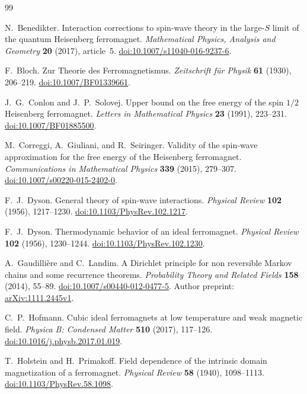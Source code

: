 \begin{thebibliography}{99}

N.~Benedikter.
Interaction corrections to spin-wave theory in the large-\(S\) limit of the
quantum Heisenberg ferromagnet.
\emph{Mathematical Physics, Analysis and Geometry} \textbf{20} (2017), article~5.
\href{https://doi.org/10.1007/s11040-016-9237-6}{doi:10.1007/s11040-016-9237-6}.

F.~Bloch.
Zur Theorie des Ferromagnetismus.
\emph{Zeitschrift f\"ur Physik} \textbf{61} (1930), 206--219.
\href{https://doi.org/10.1007/BF01339661}{doi:10.1007/BF01339661}.

J.~G.~Conlon and J.~P.~Solovej.
Upper bound on the free energy of the spin \(1/2\) Heisenberg ferromagnet.
\emph{Letters in Mathematical Physics} \textbf{23} (1991), 223--231.
\href{https://doi.org/10.1007/BF01885500}{doi:10.1007/BF01885500}.

M.~Correggi, A.~Giuliani, and R.~Seiringer.
Validity of the spin-wave approximation for the free energy of the
Heisenberg ferromagnet.
\emph{Communications in Mathematical Physics} \textbf{339} (2015), 279--307.
\href{https://doi.org/10.1007/s00220-015-2402-0}{doi:10.1007/s00220-015-2402-0}.

F.~J.~Dyson.
General theory of spin-wave interactions.
\emph{Physical Review} \textbf{102} (1956), 1217--1230.
\href{https://doi.org/10.1103/PhysRev.102.1217}{doi:10.1103/PhysRev.102.1217}.

F.~J.~Dyson.
Thermodynamic behavior of an ideal ferromagnet.
\emph{Physical Review} \textbf{102} (1956), 1230--1244.
\href{https://doi.org/10.1103/PhysRev.102.1230}{doi:10.1103/PhysRev.102.1230}.

A.~Gaudilli\`ere and C.~Landim.
A Dirichlet principle for non reversible Markov chains and some recurrence
theorems.
\emph{Probability Theory and Related Fields} \textbf{158} (2014), 55--89.
\href{https://doi.org/10.1007/s00440-012-0477-5}{doi:10.1007/s00440-012-0477-5}.
Author preprint:
\href{https://arxiv.org/abs/1111.2445v1}{arXiv:1111.2445v1}.

C.~P.~Hofmann.
Cubic ideal ferromagnets at low temperature and weak magnetic field.
\emph{Physica B: Condensed Matter} \textbf{510} (2017), 117--126.
\href{https://doi.org/10.1016/j.physb.2017.01.019}{doi:10.1016/j.physb.2017.01.019}.

T.~Holstein and H.~Primakoff.
Field dependence of the intrinsic domain magnetization of a ferromagnet.
\emph{Physical Review} \textbf{58} (1940), 1098--1113.
\href{https://doi.org/10.1103/PhysRev.58.1098}{doi:10.1103/PhysRev.58.1098}.


\end{thebibliography}
